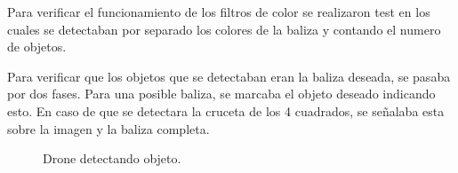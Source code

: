 

\hspace{1cm} Para verificar el funcionamiento de los filtros de color se realizaron test en los cuales se detectaban por separado los colores de la baliza y contando el numero de objetos.

\hspace{1cm} Para verificar que los objetos que se detectaban eran la baliza deseada, se pasaba por dos fases. Para una posible baliza, se marcaba el objeto deseado indicando esto. En caso de que se detectara la cruceta de los 4 cuadrados, se señalaba esta sobre la imagen y la baliza completa.

\begin{figure}[H]
 \centering
 \caption{Drone detectando objeto.}
 \label{f:Drone detecta objeto. }
\end{figure} 


